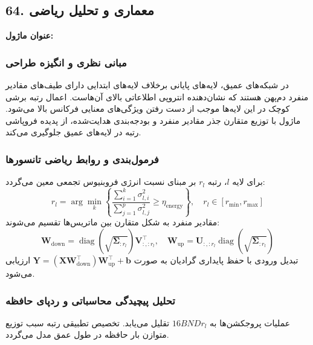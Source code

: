 \subsection*{64. معماری و تحلیل ریاضی }
\textbf{عنوان ماژول:} 

\subsubsection*{مبانی نظری و انگیزه طراحی}
در شبکه‌های عمیق، لایه‌های پایانی برخلاف لایه‌های ابتدایی دارای طیف‌های مقادیر منفرد دم‌پهن هستند که نشان‌دهنده انتروپی اطلاعاتی بالای آن‌هاست. اعمال رتبه برشی کوچک در این لایه‌ها موجب از دست رفتن ویژگی‌های معنایی فرکانس بالا می‌شود. ماژول  با توزیع متقارن جذر مقادیر منفرد و بودجه‌بندی هدایت‌شده، از پدیده فروپاشی رتبه در لایه‌های عمیق جلوگیری می‌کند.

\subsubsection*{فرمول‌بندی و روابط ریاضی تانسورها}
برای لایه $l$، رتبه $r_l$ بر مبنای نسبت انرژی فروبنیوس تجمعی معین می‌گردد:
\begin{equation}
r_l = \arg\min_k \left\{ \frac{\sum_{i=1}^k \sigma_{l, i}^2}{\sum_{j=1}^p \sigma_{l, j}^2} \ge \eta_{\text{energy}} \right\}, \quad r_l \in [r_{\min}, r_{\max}]
\end{equation}
مقادیر منفرد به شکل متقارن بین ماتریس‌ها تقسیم می‌شوند:
\begin{equation}
\mathbf{W}_{\text{down}} = \operatorname{diag}\left(\sqrt{\mathbf{\Sigma}_{:r_l}}\right) \mathbf{V}_{:, :r_l}^\top, \quad \mathbf{W}_{\text{up}} = \mathbf{U}_{:, :r_l} \operatorname{diag}\left(\sqrt{\mathbf{\Sigma}_{:r_l}}\right)
\end{equation}
تبدیل ورودی با حفظ پایداری گرادیان به صورت $\mathbf{Y} = (\mathbf{X} \mathbf{W}_{\text{down}}^\top) \mathbf{W}_{\text{up}}^\top + \mathbf{b}$ ارزیابی می‌شود.

\subsubsection*{تحلیل پیچیدگی محاسباتی و ردپای حافظه}
عملیات پروجکشن‌ها به $16 B N D r_l$  تقلیل می‌یابد. تخصیص تطبیقی رتبه سبب توزیع متوازن بار حافظه در طول عمق مدل می‌گردد.


